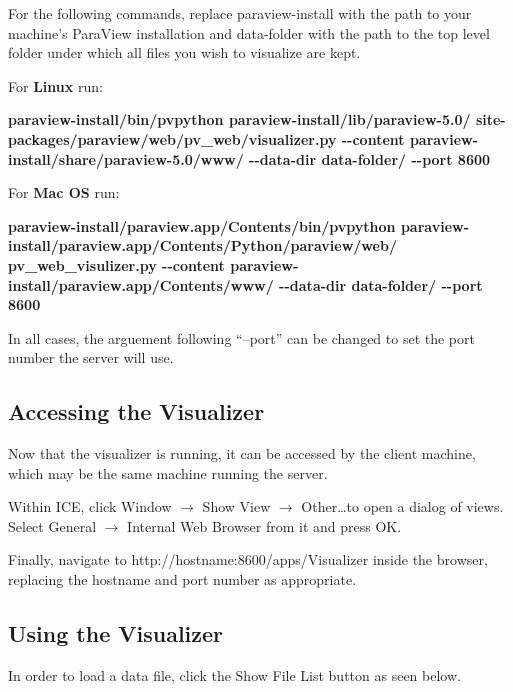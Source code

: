 \documentclass{article}
\begin{document}
For the following commands, replace paraview-install with the path to your
machine's ParaView installation and data-folder with the path to the top level
folder under which all files you wish to visualize are kept.

For \textbf{Linux} run:

\textbf{paraview-install/bin/pvpython
paraview-install/lib/paraview-5.0/\newline
site-packages/paraview/web/pv\_web/visualizer.py -{}-content
paraview-install/share/paraview-5.0/www/ -{}-data-dir data-folder/ -{}-port
8600}

For \textbf{Mac OS} run:
 
\textbf{paraview-install/paraview.app/Contents/bin/pvpython
paraview-install/paraview.app/Contents/Python/paraview/web/\newline
pv\_web\_visulizer.py -{}-content
paraview-install/paraview.app/\newline Contents/www/ -{}-data-dir data-folder/
-{}-port 8600}

In all cases, the arguement following ``--port'' can be changed to set the port
number the server will use.

\subsection{Accessing the Visualizer}

Now that the visualizer is running, it can be accessed by the client machine,
which may be the same machine running the server.

Within ICE, click Window $\rightarrow$ Show View $\rightarrow$ Other\ldots to
open a dialog of views. Select General $\rightarrow$ Internal Web Browser from
it and press OK.

Finally, navigate to http://hostname:8600/apps/Visualizer inside the browser,
replacing the hostname and port number as appropriate. 

\subsection{Using the Visualizer}

In order to load a data file, click the Show File List button as seen below.
\end{document}
